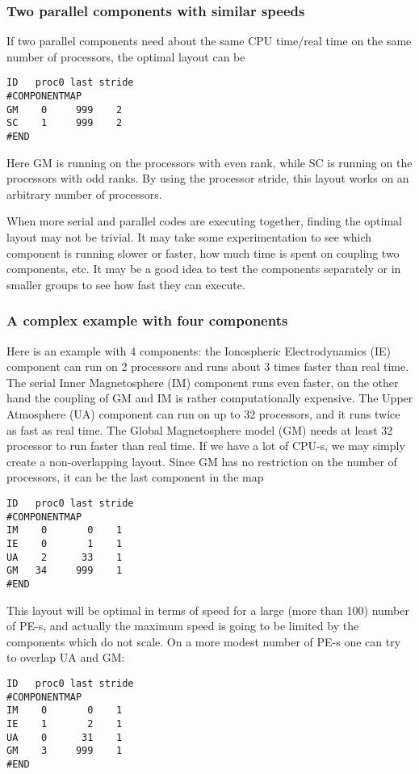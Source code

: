 \subsubsection{Two parallel components with similar speeds}

If two parallel components need about the same CPU time/real time
on the same number of processors, the optimal layout can be
\begin{verbatim}
ID   proc0 last stride
#COMPONENTMAP
GM    0     999    2
SC    1     999    2
#END
\end{verbatim}
Here GM is running on the processors with even rank,
while SC is running on the processors with odd ranks.
By using the processor stride, this layout works on
an arbitrary number of processors.

When more serial and parallel codes are executing together,
finding the optimal layout may not be trivial. 
It may take some experimentation to see which component
is running slower or faster, how much time is spent
on coupling two components, etc. It may be a good idea
to test the components separately or in smaller groups
to see how fast they can execute.

\subsubsection{A complex example with four components}

Here is an example with 4 components: the Ionospheric
Electrodynamics (IE) component can run on 2 processors and 
runs about 3 times faster than real time.
The serial Inner Magnetosphere (IM) component runs even faster,
on the other hand the coupling of GM and IM is rather
computationally expensive. The Upper Atmosphere (UA) component
can run on up to 32 processors, and it runs twice as fast
as real time. The Global Magnetosphere model (GM) needs
at least 32 processor to run faster than real time.
If we have a lot of CPU-s, we may simply create a non-overlapping
layout. Since GM has no restriction on the number of processors,
it can be the last component in the map
\begin{verbatim}
ID   proc0 last stride
#COMPONENTMAP
IM    0       0    1
IE    0       1    1
UA    2      33    1
GM   34     999    1
#END
\end{verbatim}
This layout will be optimal in terms of speed for a large 
(more than 100) number of PE-s, and actually the maximum
speed is going to be limited by the components which do
not scale. On a more modest number of PE-s one can try
to overlap UA and GM:
\begin{verbatim}
ID   proc0 last stride
#COMPONENTMAP
IM    0       0    1
IE    1       2    1
UA    0      31    1
GM    3     999    1
#END
\end{verbatim}

